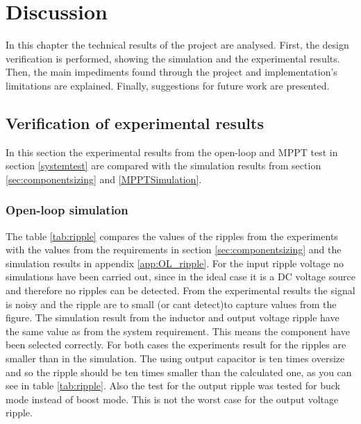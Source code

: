 \chapter{Discussion}

In this chapter the technical results of the project are analysed. First, the design verification is performed, showing the simulation and the experimental results. Then, the main impediments found through the project and implementation's limitations are explained. Finally, suggestions for future work are presented.

\section{Verification of experimental results}
In this section the experimental results from the open-loop and MPPT test in section \ref{systemtest} are compared with the simulation results from section \ref{sec:componentsizing} and \ref{MPPTSimulation}.

\subsection{Open-loop simulation} \label{ol_discussion}


The table \ref{tab:ripple} compares the values of the ripples from the experiments with the values from the requirements in section \ref{sec:componentsizing} and the simulation results in appendix \ref{app:OL_ripple}. For the input ripple voltage no simulations have been carried out, since in the ideal case it is a DC voltage source and therefore no ripples can be detected. From the experimental results the signal is noisy and the ripple are to small (or cant detect)to capture values from the figure. The simulation result from the inductor and output voltage ripple have the same value as from the system requirement. This means the component have been selected correctly. For both cases the experiments result for the ripples are smaller than in the simulation. The using output capacitor is ten times oversize and so the ripple should be ten times smaller than the calculated one, as you can see in table \ref{tab:ripple}. Also the test for the output ripple was tested for buck mode instead of boost mode. This is not the worst case for the output voltage ripple.

